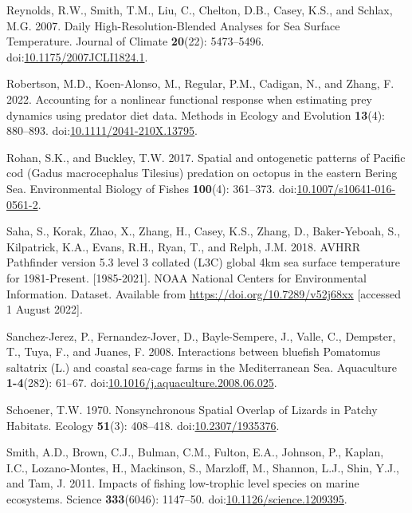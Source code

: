 \documentclass[
]{article}
\newlength{\cslhangindent}
\newlength{\cslentryspacingunit} %
\newenvironment{CSLReferences}[2] %
 {%
  \setlength{\parindent}{0pt}
  \ifodd #1
  \let\oldpar\par
  \def\par{\hangindent=\cslhangindent\oldpar}
  \fi
  \setlength{\parskip}{#2\cslentryspacingunit}
 }%
 {}
\begin{document}
\begin{CSLReferences}{1}{0}
\leavevmode{}%
Reynolds, R.W., Smith, T.M., Liu, C., Chelton, D.B., Casey, K.S., and Schlax, M.G. 2007. Daily {High}-{Resolution}-{Blended} {Analyses} for {Sea} {Surface} {Temperature}. Journal of Climate \textbf{20}(22): 5473--5496. doi:\href{https://doi.org/10.1175/2007JCLI1824.1}{10.1175/2007JCLI1824.1}.

\leavevmode{}%
Robertson, M.D., Koen-Alonso, M., Regular, P.M., Cadigan, N., and Zhang, F. 2022. Accounting for a nonlinear functional response when estimating prey dynamics using predator diet data. Methods in Ecology and Evolution \textbf{13}(4): 880--893. doi:\href{https://doi.org/10.1111/2041-210X.13795}{10.1111/2041-210X.13795}.

\leavevmode{}%
Rohan, S.K., and Buckley, T.W. 2017. Spatial and ontogenetic patterns of {Pacific} cod ({Gadus} macrocephalus {Tilesius}) predation on octopus in the eastern {Bering} {Sea}. Environmental Biology of Fishes \textbf{100}(4): 361--373. doi:\href{https://doi.org/10.1007/s10641-016-0561-2}{10.1007/s10641-016-0561-2}.

\leavevmode{}%
Saha, S., Korak, Zhao, X., Zhang, H., Casey, K.S., Zhang, D., Baker-Yeboah, S., Kilpatrick, K.A., Evans, R.H., Ryan, T., and Relph, J.M. 2018. {AVHRR} {Pathfinder} version 5.3 level 3 collated ({L3C}) global 4km sea surface temperature for 1981-{Present}. {[}1985-2021{]}. {NOAA} {National} {Centers} for {Environmental} {Information}. {Dataset}. Available from \url{https://doi.org/10.7289/v52j68xx} {[}accessed 1 August 2022{]}.

\leavevmode{}%
Sanchez-Jerez, P., Fernandez-Jover, D., Bayle-Sempere, J., Valle, C., Dempster, T., Tuya, F., and Juanes, F. 2008. Interactions between bluefish {Pomatomus} saltatrix ({L}.) and coastal sea-cage farms in the {Mediterranean} {Sea}. Aquaculture \textbf{1-4}(282): 61--67. doi:\href{https://doi.org/10.1016/j.aquaculture.2008.06.025}{10.1016/j.aquaculture.2008.06.025}.

\leavevmode{}%
Schoener, T.W. 1970. Nonsynchronous {Spatial} {Overlap} of {Lizards} in {Patchy} {Habitats}. Ecology \textbf{51}(3): 408--418. doi:\href{https://doi.org/10.2307/1935376}{10.2307/1935376}.

\leavevmode{}%
Smith, A.D., Brown, C.J., Bulman, C.M., Fulton, E.A., Johnson, P., Kaplan, I.C., Lozano-Montes, H., Mackinson, S., Marzloff, M., Shannon, L.J., Shin, Y.J., and Tam, J. 2011. Impacts of fishing low-trophic level species on marine ecosystems. Science \textbf{333}(6046): 1147--50. doi:\href{https://doi.org/10.1126/science.1209395}{10.1126/science.1209395}.


\end{CSLReferences}
\end{document}

